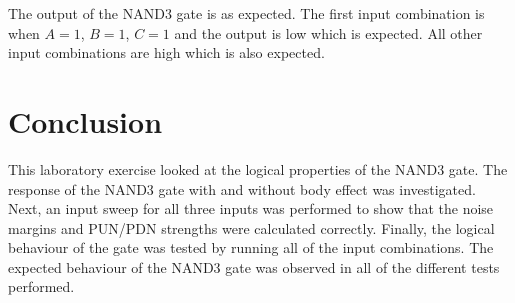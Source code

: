 \documentclass[CMPE]{../KGCOEReport}
\begin{document}
	The output of the NAND3 gate is as expected. The first input combination
	is when $A=1$, $B=1$, $C=1$ and the output is low which is expected.
	All other input combinations are high which is also expected. 

	\section*{Conclusion}
	This laboratory exercise looked at the logical properties of the
	NAND3 gate. The response of the NAND3 gate with and without body
	effect was investigated. Next, an input sweep for all three inputs
	was performed to show that the noise margins and PUN/PDN strengths
	were calculated correctly. Finally, the logical behaviour of the gate
	was tested by running all of the input combinations. The expected
	behaviour of the NAND3 gate was observed in all of the different tests
	performed.
\end{document}
